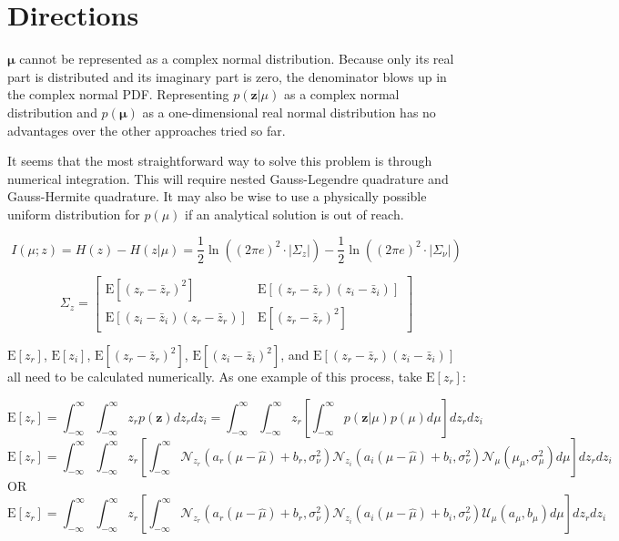 \documentclass{article}         %
\theoremstyle{definition}
\theoremstyle{remark}
\newcommand{\eq}[1]{\begin{equation} #1 \end{equation}}
\newcommand{\zbf}{\mathbf{z}}
\newcommand{\mubf}{\boldsymbol{\mu}}
\newcommand{\zcond}{\mathbf{z}|\mu}
\newcommand{\Nscript}{\mathcal{N}}
\newcommand{\paren}[1]{\left(#1\right)}
\newcommand{\bracket}[1]{\left[#1\right]}
\newcommand{\expect}[1]{\mathrm{E}\left[#1\right]}
\begin{document}
\section{Directions}\label{Directions}

$\mubf$ cannot be represented as a complex normal distribution. Because only its real part is distributed and its imaginary part is zero, the denominator blows up in the complex normal PDF. Representing $p\paren{\zcond}$ as a complex normal distribution and $p\paren{\mubf}$ as a one-dimensional real normal distribution has no advantages over the other approaches tried so far.  

It seems that the most straightforward way to solve this problem is through numerical integration. This will require nested Gauss-Legendre quadrature and Gauss-Hermite quadrature. It may also be wise to use a physically possible uniform distribution for $p\paren{\mu}$ if an analytical solution is out of reach.

\begin{equation}
	I\left(\mu;z\right) = H\left(z\right) - H\left(z|\mu\right) 
	= \frac{1}{2}\ln\left(\left(2\pi e\right)^2\cdot\lvert\Sigma_z\rvert\right) - \frac{1}{2}\ln\left(\left(2\pi e\right)^2\cdot\lvert\Sigma_\nu\rvert\right)
\end{equation}

\begin{equation}
	\Sigma_z = \left[ \begin{array}{cc}
	\mathrm{E}\left[\left(z_r - \bar{z}_r\right)^2\right] & \mathrm{E}\left[\left(z_r - \bar{z}_r\right)\left(z_i - \bar{z}_i\right)\right] \\
	\mathrm{E}\left[\left(z_i - \bar{z}_i\right)\left(z_r - \bar{z}_r\right)\right] & \mathrm{E}\left[\left(z_r - \bar{z}_r\right)^2\right] \end{array} \right]
\end{equation}

$\expect{z_r}$, $\expect{z_i}$, $\expect{\left(z_r - \bar{z}_r\right)^2}$, $\expect{\left(z_i - \bar{z}_i\right)^2}$, and $\expect{\left(z_r - \bar{z}_r\right)\left(z_i - \bar{z}_i\right)}$ all need to be calculated numerically. As one example of this process, take $\expect{z_r}$:

\eq{\expect{z_r} = \int_{-\infty}^\infty\int_{-\infty}^\infty z_r p\paren{\zbf}dz_rdz_i = \int_{-\infty}^\infty\int_{-\infty}^\infty z_r \bracket{\int_{-\infty}^\infty p\paren{\zcond}p\paren{\mu}d\mu}dz_rdz_i}
\eq{\expect{z_r} = \int_{-\infty}^\infty\int_{-\infty}^\infty z_r \bracket{\int_{-\infty}^\infty \Nscript_{z_r}\paren{a_r\paren{\mu - \hat{\mu}} + b_r,\sigma_\nu^2}\Nscript_{z_i}\paren{a_i\paren{\mu - \hat{\mu}} + b_i,\sigma_\nu^2}\Nscript_\mu\paren{\mu_\mu,\sigma_\mu^2} d\mu}dz_rdz_i}
OR
\eq{\expect{z_r} = \int_{-\infty}^\infty\int_{-\infty}^\infty z_r \bracket{\int_{-\infty}^\infty \Nscript_{z_r}\paren{a_r\paren{\mu - \hat{\mu}} + b_r,\sigma_\nu^2}\Nscript_{z_i}\paren{a_i\paren{\mu - \hat{\mu}} + b_i,\sigma_\nu^2}\mathcal{U}_\mu\paren{a_\mu,b_\mu} d\mu}dz_rdz_i}
\end{document}
